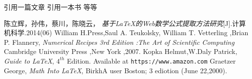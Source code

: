 \documentclass{ctexart}
\begin{document}
    引用一篇文章 \cite{article1}   引用一本书 \cite{book1} 等等
    \begin{thebibliography}{99}
        陈立辉，孙伟，蔡川，陈晓云， \emph{基于LaTeX的Web数学公式提取方法研究}[J].计算机科学.2014(06)
        William H.Press,Saul A. Teukolsky,
        William T. Vetterling ,Brian P. Flannery,
        \emph{Numerical Recipes 3rd Edition :The Art of Scientific Computing }
        Cambridge University Press ,New York ,2007.
        Kopka Helmut,W.Daly Patrick,
        \emph{Guide to \LaTeX}, $ 4^{th} $ Edition.
        Available at \texttt{https://www.amazon.com}
         Graetzer George, \emph{Math Into \LaTeX},
        BirkhA user Boston; 3 ediotion (June 22,2000).
    \end{thebibliography}
\end{document}
